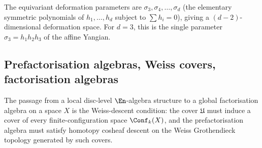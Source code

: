 The equivariant deformation parameters are $\sigma_3, \sigma_4, \ldots, \sigma_d$ (the elementary symmetric polynomials of $h_1, \ldots, h_d$ subject to $\sum h_i = 0$), giving a $(d-2)$-dimensional deformation space. For $d = 3$, this is the single parameter $\sigma_3 = h_1 h_2 h_3$ of the affine Yangian.

\subsection{Prefactorisation algebras, Weiss covers, factorisation algebras}
\label{subsec:prefact-weiss-fact}

The passage from a local disc-level $\En$-algebra structure to a global factorisation algebra on a space $X$ is the Weiss-descent condition: the cover $\mathfrak U$ must induce a cover of every finite-configuration space $\Conf_k(X)$, and the prefactorisation algebra must satisfy homotopy cosheaf descent on the Weiss Grothendieck topology generated by such covers.

